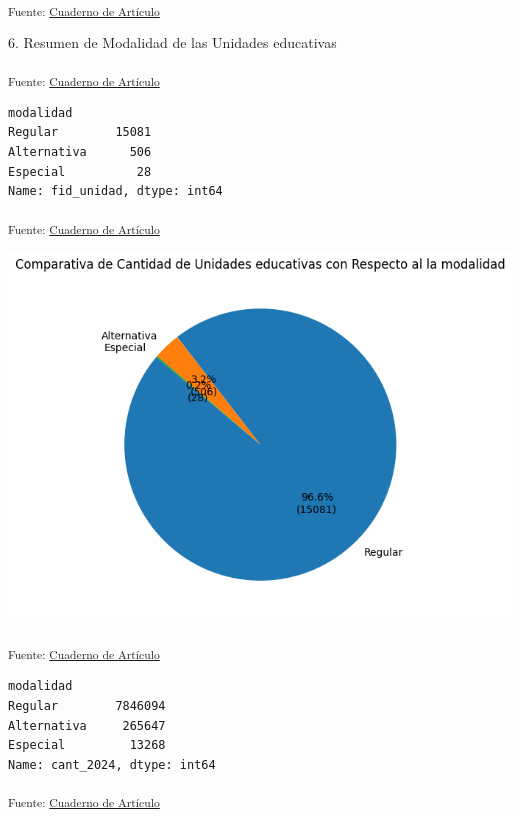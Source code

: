 \documentclass[
  12pt]{article}
\begin{document}
\textsubscript{Fuente:
\href{https://sociest.github.io/ue-report/index.ipynb.html}{Cuaderno de
Artículo}}

6. Resumen de Modalidad de las Unidades educativas

\textsubscript{Fuente:
\href{https://sociest.github.io/ue-report/index.ipynb.html}{Cuaderno de
Artículo}}

\begin{verbatim}
modalidad
Regular        15081
Alternativa      506
Especial          28
Name: fid_unidad, dtype: int64
\end{verbatim}

\textsubscript{Fuente:
\href{https://sociest.github.io/ue-report/index.ipynb.html}{Cuaderno de
Artículo}}

\includegraphics{index_files/figure-pdf/cell-29-output-1.png}

\textsubscript{Fuente:
\href{https://sociest.github.io/ue-report/index.ipynb.html}{Cuaderno de
Artículo}}

\begin{verbatim}
modalidad
Regular        7846094
Alternativa     265647
Especial         13268
Name: cant_2024, dtype: int64
\end{verbatim}

\textsubscript{Fuente:
\href{https://sociest.github.io/ue-report/index.ipynb.html}{Cuaderno de
Artículo}}
\end{document}
